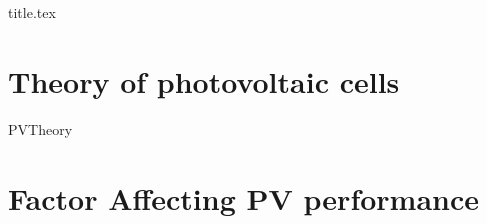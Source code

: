 \documentclass[crop=false,parskip=half]{scrartcl}
\begin{document}
{title.tex}

\tableofcontents


\section{Theory of photovoltaic cells}\label{sec:PVTheory}
{PVTheory}
\section{Factor Affecting PV performance}


\end{document}
